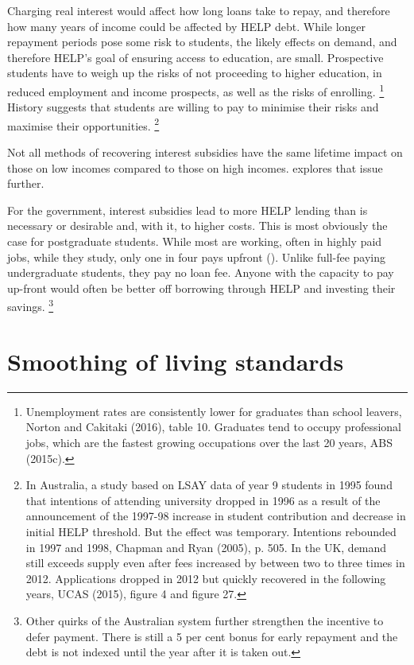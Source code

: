 \documentclass[embargoed]{grattan}
\begin{document}
Charging real interest would affect how long loans take to repay, and therefore how many years of income could be affected by \gls{HELP} debt.
While longer repayment periods pose some risk to students, the likely effects on demand, and therefore \gls{HELP}'s goal of ensuring access to education, are small.
Prospective students have to weigh up the risks of not proceeding to higher education, in reduced employment and income prospects, as well as the risks of enrolling.%
\footnote{Unemployment rates are consistently lower for graduates than school leavers, Norton and Cakitaki (2016), table 10.
Graduates tend to occupy professional jobs, which are the fastest growing occupations over the last 20 years, ABS (2015c).} History suggests that students are willing to pay to minimise their risks and maximise their opportunities.%
\footnote{In Australia, a study based on LSAY data of year 9 students in 1995 found that intentions of attending university dropped in 1996 as a result of the announcement of the 1997-98 increase in student contribution and decrease in initial \gls{HELP} threshold.
But the effect was temporary.
Intentions rebounded in 1997 and 1998, Chapman and Ryan (2005), p. 505.
In the UK, demand still exceeds supply even after fees increased by between two to three times in 2012.
Applications dropped in 2012 but quickly recovered in the following years, UCAS (2015), figure 4 and figure 27.}

Not all methods of recovering interest subsidies have the same lifetime impact on those on low incomes compared to those on high incomes.
 explores that issue further.

For the government, interest subsidies lead to more \gls{HELP} lending than is necessary or desirable and, with it, to higher costs.
This is most obviously the case for postgraduate students.
While most are working, often in highly paid jobs, while they study, only one in four pays upfront ().
Unlike full-fee paying undergraduate students, they pay no loan fee.
Anyone with the capacity to pay up-front would often be better off borrowing through \gls{HELP} and investing their savings.%
\footnote{Other quirks of the Australian system further strengthen the incentive to defer payment.
There is still a 5 per cent bonus for early repayment and the debt is not indexed until the year after it is taken out.}

\section{Smoothing of living standards}\label{smoothing-of-living-standards}
\end{document}

